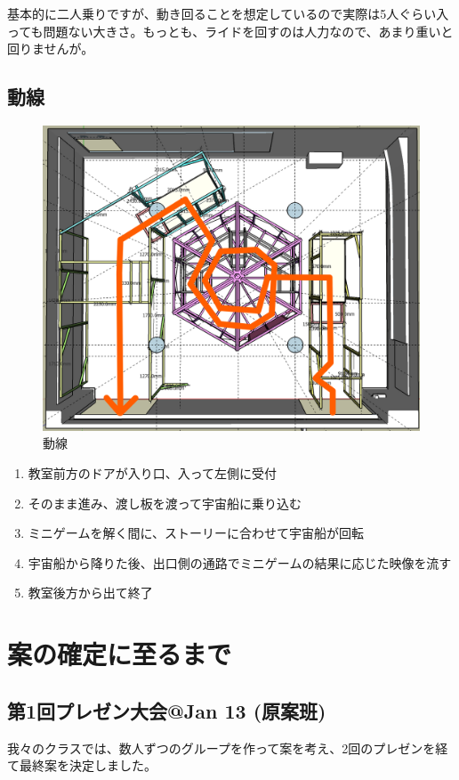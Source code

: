 \documentclass{jsarticle}
\begin{document}
基本的に二人乗りですが、動き回ることを想定しているので実際は5人ぐらい入っても問題ない大きさ。もっとも、ライドを回すのは人力なので、あまり重いと回りませんが。

\clearpage

\subsection{動線}

\begin{figure}[htbp]
    \centering
    \includegraphics[width=0.6\linewidth]{images/plan_overview/lane.png}
    \caption{動線}
    \label{fig:動線}
\end{figure}

\begin{enumerate}
    \item 教室前方のドアが入り口、入って左側に受付
    \item そのまま進み、渡し板を渡って宇宙船に乗り込む
    \item ミニゲームを解く間に、ストーリーに合わせて宇宙船が回転
    \item 宇宙船から降りた後、出口側の通路でミニゲームの結果に応じた映像を流す
    \item 教室後方から出て終了
\end{enumerate}

\clearpage

\section{案の確定に至るまで}

\subsection{第1回プレゼン大会@Jan 13 (原案班)}

我々のクラスでは、数人ずつのグループを作って案を考え、2回のプレゼンを経て最終案を決定しました。
\end{document}

